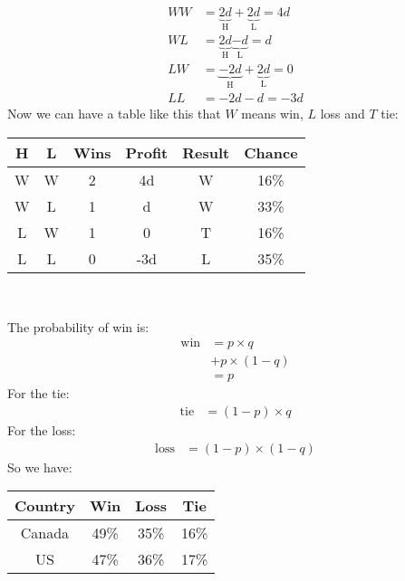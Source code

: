 \documentclass{book}
\begin{document}
	\begin{equation*}
		\begin{split}
			WW &= \underbrace{2d}_\text{H} + \underbrace{2d}_\text{L} = 4d \\
			WL &= \underbrace{2d}_\text{H} \underbrace{-d}_\text{L} = d \\
			LW &= \underbrace{-2d}_\text{H} + \underbrace{2d}_\text{L} = 0 \\
			LL &= -2d - d = -3d
		\end{split}
	\end{equation*}
	Now we can have a table like this that $W$ means win, $L$ loss and $T$ tie: \\
	\par
	\begin{tabular}[h!]{c c c c c c}
		\toprule
		H & L & Wins & Profit & Result & Chance \\
		\midrule
		W & W & 2 & 4d & W & 16\% \\
		W & L & 1 & d & W & 33\% \\
		L & W & 1 & 0 & T & 16\% \\
		L & L & 0 & -3d & L & 35\% \\
		\bottomrule
	\end{tabular} \\	
	\par The probability of win is:
	\begin{equation*}
		\begin{split}
			\text{win} &= p \times q \\
			&+ p \times (1 - q) \\
			&= p
		\end{split}
	\end{equation*}
	For the tie:
	\begin{equation*}
		\begin{split}
			\text{tie} &= (1 - p) \times q
		\end{split}
	\end{equation*}
	For the loss:
	\begin{equation*}
		\begin{split}
			\text{loss} &= (1 - p) \times (1 - q)
		\end{split}
	\end{equation*}
	So we have: \\
	\par 
	\begin{tabular}[h!]{c c c c}
		\toprule
		Country & Win & Loss & Tie \\
		\midrule
		Canada & 49\% & 35\% & 16\% \\
		US & 47\% & 36\% & 17\% \\
		\bottomrule
	\end{tabular} \\
\end{document}
